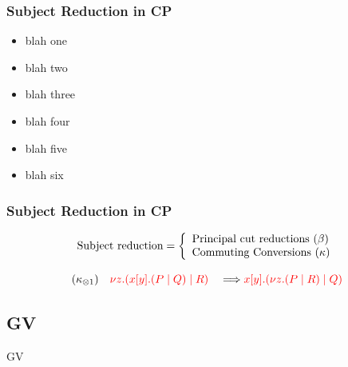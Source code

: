 \documentclass{beamer}
\let\oldframetitle\frametitle
\renewcommand{\frametitle}[1]{
  \oldframetitle{#1}\vspace{-3.5cm}
}
\begin{document}

\begin{frame}
\oldframetitle{Subject Reduction in CP}
\subred
\begin{itemize}
\item {\fontsize{6}{7.2}\selectfont blah one}
\item blah two
\item blah three
\item blah four
\item blah five
\item blah six
\end{itemize}
\end{frame}

\begin{frame}
\frametitle{Subject Reduction in CP}
\[\colored
\begin{array}{c}
\mbox{Subject reduction} = \left\{ \begin{array}{ll}
                                   \mbox{Principal cut reductions}~(\beta)\\
                                   \mbox{Commuting Conversions}~(\kappa)
                                   \end{array} \right.
\\~\\
(\kappa_{\otimes1}) \quad
\tm{\nu z\Of{C}.(x[y].(P \mid Q) \mid R)}
\quad \becomes \hfill
\hfill \tm{x[y].(\nu z\Of{C}.(P \mid R) \mid Q)}
\end{array}
\]
\end{frame}

\begin{comment}
Subject reduction in CP proceeds by cut reductions of the logical operators
against their duals and \textit{commuting conversions} as well as some other
rules. Commuting conversions push a cut inside a logical operator and the
intuition is that they permit further communication to occur which was guarded
by a cut.
\end{comment}

\subsection{GV}

\begin{frame}
GV
\end{frame}
\end{document}
